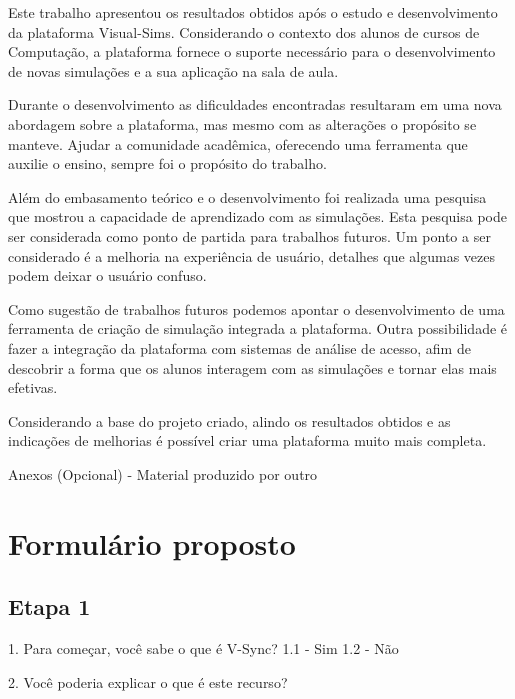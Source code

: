 \documentclass[tcc,capa]{texufpel}
\begin{document}
Este trabalho apresentou os resultados obtidos após o estudo e desenvolvimento da plataforma Visual-Sims. Considerando o contexto dos alunos de cursos de Computação, a plataforma fornece o suporte necessário para o desenvolvimento de novas simulações e a sua aplicação na sala de aula. 

Durante o desenvolvimento as dificuldades encontradas resultaram em uma nova abordagem sobre a plataforma, mas mesmo com as alterações o propósito se manteve. Ajudar a comunidade acadêmica, oferecendo uma ferramenta que auxilie o ensino, sempre foi o propósito do trabalho. 

Além do embasamento teórico e o desenvolvimento foi realizada uma pesquisa que mostrou a capacidade de aprendizado com as simulações. Esta pesquisa pode ser considerada como ponto de partida para trabalhos futuros. Um ponto a ser considerado é a melhoria na experiência de usuário, detalhes que algumas vezes podem deixar o usuário confuso. 

Como sugestão de trabalhos futuros podemos apontar o desenvolvimento de uma ferramenta de criação de simulação integrada a plataforma. Outra possibilidade é fazer a integração da plataforma com sistemas de análise de acesso, afim de descobrir a forma que os alunos interagem com as simulações e tornar elas mais efetivas.

Considerando a base do projeto criado, alindo os resultados obtidos e as indicações de melhorias é possível criar uma plataforma muito mais completa.


 


Anexos (Opcional) - Material produzido por outro
\anexos
\chapter{Formulário proposto}
\label{anexo: formulario}

\section{Etapa 1}
1. Para começar, você sabe o que é V-Sync?
    1.1 - Sim
    1.2 - Não

2. Você poderia explicar o que é este recurso?
\end{document}
